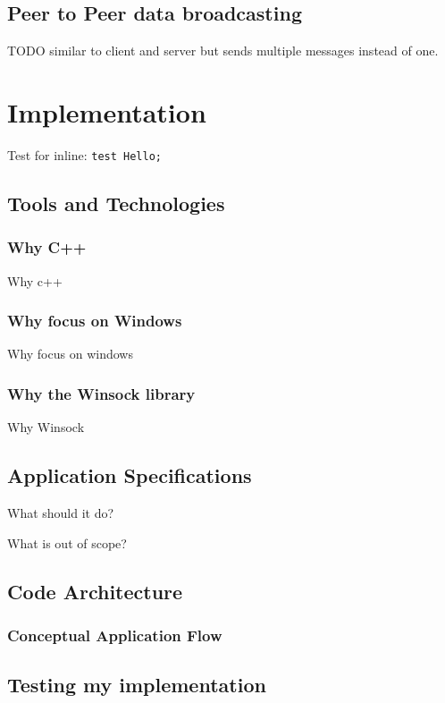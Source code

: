 \subsection{Peer to Peer data broadcasting}
TODO similar to client and server but sends multiple messages instead of one.



\section{Implementation}

Test for inline: \lstinline{test Hello;}


\subsection{Tools and Technologies}

\subsubsection{Why C++}
Why c++


\subsubsection{Why focus on Windows}
Why focus on windows



\subsubsection{Why the Winsock library}
Why Winsock



\subsection{Application Specifications}

What should it do?

What is out of scope?

\subsection{Code Architecture}

\subsubsection{Conceptual Application Flow}


\subsection{Testing my implementation}
